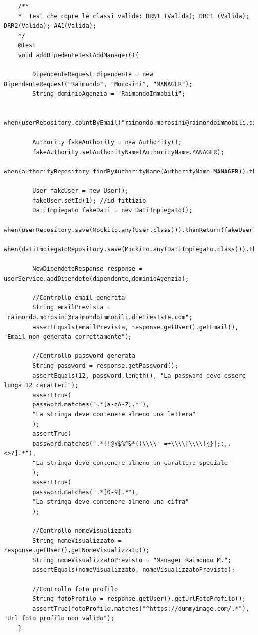 \begin{lstlisting}
	/**
	*  Test che copre le classi valide: DRN1 (Valida); DRC1 (Valida); DRR2(Valida); AA1(Valida);
	*/
	@Test
	void addDipedenteTestAddManager(){
		
		DipendenteRequest dipendente = new DipendenteRequest("Raimondo", "Morosini", "MANAGER");
		String dominioAgenzia = "RaimondoImmobili";
		
		when(userRepository.countByEmail("raimondo.morosini@raimondoimmobili.dietiestate.com")).thenReturn(0);
		
		Authority fakeAuthority = new Authority();
		fakeAuthority.setAuthorityName(AuthorityName.MANAGER);
		when(authorityRepository.findByAuthorityName(AuthorityName.MANAGER)).thenReturn(Optional.of(fakeAuthority));
		
		User fakeUser = new User();
		fakeUser.setId(1); //id fittizio
		DatiImpiegato fakeDati = new DatiImpiegato();
		when(userRepository.save(Mockito.any(User.class))).thenReturn(fakeUser);
		when(datiImpiegatoRepository.save(Mockito.any(DatiImpiegato.class))).thenReturn(fakeDati);
		
		NewDipendeteResponse response = userService.addDipendete(dipendente,dominioAgenzia);
		
		//Controllo email generata
		String emailPrevista = "raimondo.morosini@raimondoimmobili.dietiestate.com";
		assertEquals(emailPrevista, response.getUser().getEmail(), "Email non generata correttamente");
		
		//Controllo password generata
		String password = response.getPassword();
		assertEquals(12, password.length(), "La password deve essere lunga 12 caratteri");
		assertTrue(
		password.matches(".*[a-zA-Z].*"),
		"La stringa deve contenere almeno una lettera"
		);
		assertTrue(
		password.matches(".*[!@#$%^&*()\\\\-_=+\\\\[\\\\]{}|;:,.<>?].*"),
		"La stringa deve contenere almeno un carattere speciale"
		);
		assertTrue(
		password.matches(".*[0-9].*"),
		"La stringa deve contenere almeno una cifra"
		);
		
		//Controllo nomeVisualizzato
		String nomeVisualizzato = response.getUser().getNomeVisualizzato();
		String nomeVisualizzatoPrevisto = "Manager Raimondo M.";
		assertEquals(nomeVisualizzato, nomeVisualizzatoPrevisto);
		
		//Controllo foto profilo
		String fotoProfilo = response.getUser().getUrlFotoProfilo();
		assertTrue(fotoProfilo.matches("^https://dummyimage.com/.*"), "Url foto profilo non valido");
	}
\end{lstlisting}

